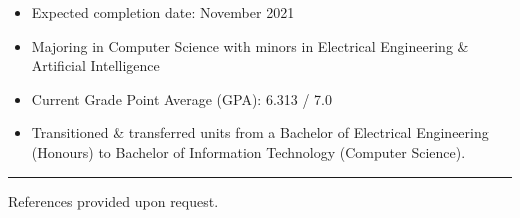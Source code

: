 \documentclass[10pt, a4paper]{altacv}
\begin{document}
	\begin{itemize}
		\item Expected completion date: November 2021
		\item Majoring in Computer Science with minors in Electrical Engineering \& Artificial Intelligence
		\item Current Grade Point Average (GPA): 6.313 / 7.0
		\item Transitioned \& transferred units from a Bachelor of Electrical Engineering (Honours) to Bachelor of Information Technology (Computer Science).
	\end{itemize}
    \medskip
    \par\noindent\rule{\textwidth}{0.4pt}
    References provided upon request.
\end{document}
